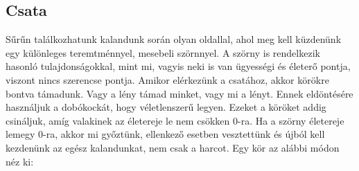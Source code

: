 \documentclass{article}
\begin{document}
      \subsection{Csata}
        Sűrűn találkozhatunk kalandunk során olyan oldallal, ahol meg kell
        küzdenünk egy különleges teremtménnyel, mesebeli szörnnyel. A szörny is
        rendelkezik hasonló tulajdonságokkal, mint mi, vagyis neki is van
        ügyességi és életerő pontja, viszont nincs szerencse pontja.
        Amikor elérkezünk a csatához, akkor körökre bontva támadunk. Vagy a
        lény támad minket, vagy mi a lényt. Ennek eldöntésére használjuk a
        dobókockát, hogy véletlenszerű legyen. Ezeket a köröket addig
        csináljuk, amíg valakinek az életereje le nem csökken 0-ra. Ha a
        szörny életereje lemegy 0-ra, akkor mi győztünk, ellenkező esetben
        vesztettünk és újból kell kezdenünk az egész kalandunkat, nem csak a
        harcot. Egy kör az alábbi módon néz ki:
\end{document}

